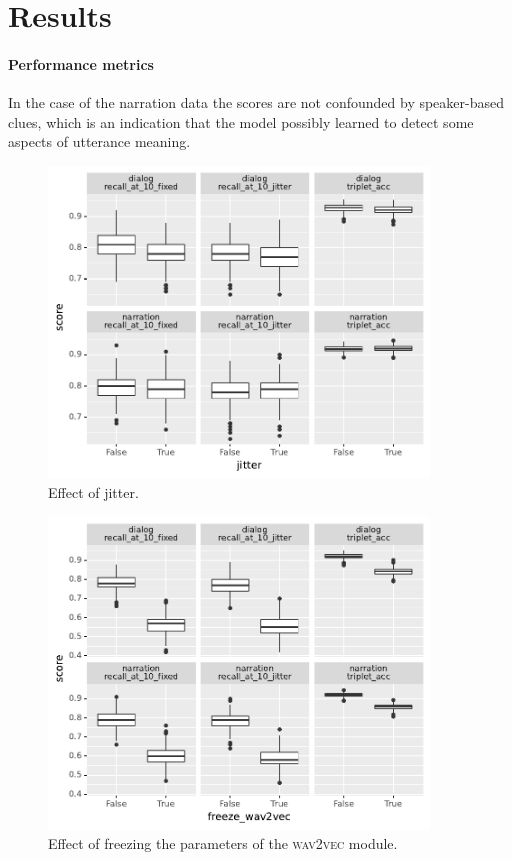\section{Results}
\label{sec:results}
\paragraph{Performance metrics}


In the case of the narration data the scores are not confounded by
speaker-based clues, which is an indication that the model possibly
learned to detect some aspects of utterance meaning. 

\begin{figure}[htb]
  \centering
  \includegraphics[width=0.9\textwidth]{results/ablations/jitter.pdf}
  \caption{Effect of jitter.}
  \label{fig:jitter}
\end{figure}

\begin{figure}[htb]
  \centering
  \includegraphics[width=0.9\textwidth]{results/ablations/freeze_wav2vec.pdf}
  \caption{Effect of freezing the parameters of the \textsc{wav2vec} module.}
  \label{fig:freeze_wav2vec}
\end{figure}

